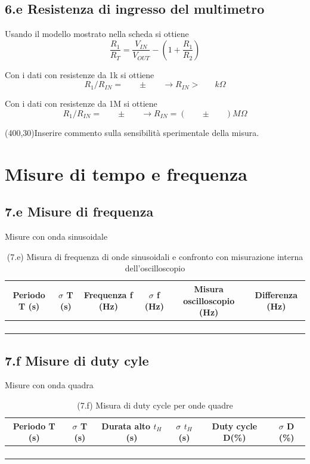 \documentclass[10pt,a4paper]{article}
\newcommand{\exn}{\phantom{xxx}}
\begin{document}
\subsection*{6.e Resistenza di ingresso del multimetro}
Usando il modello mostrato nella scheda si ottiene
\[ \frac{R_1}{R_T} =  \frac{V_{IN}}{V_{OUT}} - (1 +  \frac{R_1}{R_2} )
\]

Con i dati con resistenze da 1k si ottiene
\[ R_1/R_{IN} = \exn  \pm  \exn   \rightarrow  R_{IN} > \exn k\Omega
\]


Con i dati con resistenze da 1M si ottiene
\[ R_1/R_{IN} = \exn  \pm  \exn   \rightarrow  R_{IN} = (\exn \pm  \exn)  M\Omega
\]

\framebox(400,30){Inserire commento sulla sensibilit\`a sperimentale della misura.} 




\section{Misure di tempo e frequenza}

\subsection*{7.e Misure di frequenza}
Misure con onda sinusoidale
\begin{table}[h]
\centering
\begin{tabular}{|c|c|c|c|c|c|}
\hline 
Periodo T (s)& $\sigma$ T (s)  &Frequenza f (Hz) & $\sigma$ f (Hz) &
Misura oscilloscopio (Hz) & Differenza (Hz)\\
\hline 
\exn & \exn & \exn & \exn & \exn &\exn \\
\exn & \exn & \exn & \exn & \exn &\exn \\
\exn & \exn & \exn & \exn & \exn &\exn \\
\exn & \exn & \exn & \exn & \exn &\exn \\
\hline 
\end{tabular} 
\caption{(7.e) Misura di frequenza di onde sinusoidali e confronto con
misurazione interna dell'oscilloscopio }
\end{table}

\subsection*{7.f Misure di duty cyle}
Misure con onda quadra
\begin{table}[h]
\centering
\begin{tabular}{|c|c|c|c|c|c|}
\hline 
Periodo T (s)& $\sigma$ T (s) & Durata alto $t_H$ (s) & $\sigma$ $t_H$ (s)
& Duty cycle D(\%) & $\sigma$ D (\%) \\
\hline 
\exn & \exn & \exn & \exn & \exn &\exn \\
\exn & \exn & \exn & \exn & \exn &\exn \\
\exn & \exn & \exn & \exn & \exn &\exn \\
\exn & \exn & \exn & \exn & \exn &\exn \\
\hline 
\end{tabular} 
\caption{(7.f) Misura di duty cycle per onde quadre }
\end{table}
\end{document}
